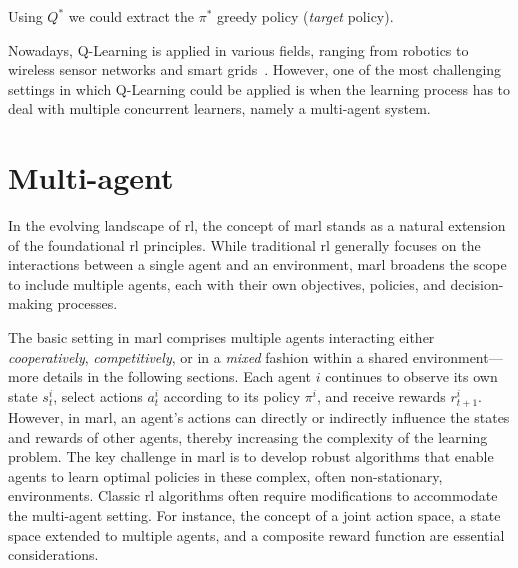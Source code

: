%
Using $Q^*$ we could extract the $\pi^*$ greedy policy (\emph{target} policy).

Nowadays, Q-Learning is applied in various fields, ranging from robotics to wireless sensor networks and smart grids~\cite{DBLP:journals/access/JangKHK19}.
%
However, one of the most challenging settings in which Q-Learning could be applied is when the learning process has to deal with multiple concurrent learners, namely a multi-agent system.
\section{Multi-agent}
In the evolving landscape of \ac{rl}, the concept of \ac{marl} stands as a natural extension of the foundational \ac{rl} principles. 
 While traditional \ac{rl} generally focuses on the interactions between a single agent and an environment, 
 \ac{marl} broadens the scope to include multiple agents, 
 each with their own objectives, policies, and decision-making processes.

The basic setting in \ac{marl} comprises multiple agents interacting either \emph{cooperatively}, \emph{competitively}, or in a \emph{mixed} fashion within a shared environment---more details in the following sections. 
 Each agent $i$ continues to observe its own state $s_{t}^{i}$, select actions $a_{t}^{i}$ according to its policy $\pi^{i}$, and receive rewards $r_{t+1}^{i}$.
 However, in \ac{marl}, 
 an agent's actions can directly or indirectly influence the states and rewards of other agents, 
 thereby increasing the complexity of the learning problem.
The key challenge in \ac{marl} is to develop robust algorithms that enable agents to learn optimal policies in these complex, often non-stationary, environments. Classic \ac{rl} algorithms often require modifications to accommodate the multi-agent setting. For instance, the concept of a joint action space, a state space extended to multiple agents, and a composite reward function are essential considerations.
